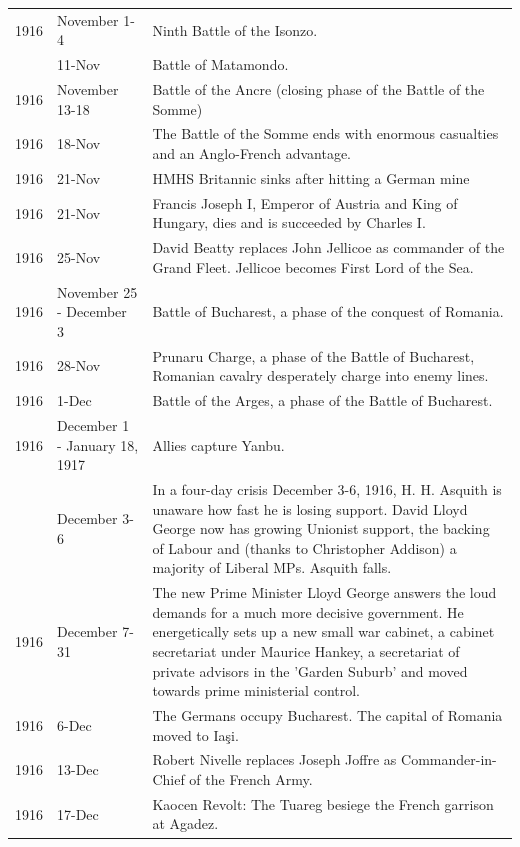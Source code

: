 \documentclass[
  openany]{book}
\begin{document}
\begin{longtable}[t]{rl>{\raggedright\arraybackslash}p{22em}}
\rowcolor{gray!6}  1916 & November 1-4 & Ninth Battle of the Isonzo.\\
\addlinespace
1916 & 11-Nov & Battle of Matamondo.\\
\rowcolor{gray!6}  1916 & November 13-18 & Battle of the Ancre (closing phase of the Battle of the Somme)\\
1916 & 18-Nov & The Battle of the Somme ends with enormous casualties and an Anglo-French advantage.\\
\rowcolor{gray!6}  1916 & 21-Nov & HMHS Britannic sinks after hitting a German mine\\
1916 & 21-Nov & Francis Joseph I, Emperor of Austria and King of Hungary, dies and is succeeded by Charles I.\\
\addlinespace
\rowcolor{gray!6}  1916 & 25-Nov & David Beatty replaces John Jellicoe as commander of the Grand Fleet. Jellicoe becomes First Lord of the Sea.\\
1916 & November 25 - December 3 & Battle of Bucharest, a phase of the conquest of Romania.\\
\rowcolor{gray!6}  1916 & 28-Nov & Prunaru Charge, a phase of the Battle of Bucharest, Romanian cavalry desperately charge into enemy lines.\\
1916 & 1-Dec & Battle of the Arges, a phase of the Battle of Bucharest.\\
\rowcolor{gray!6}  1916 & December 1 - January 18, 1917 & Allies capture Yanbu.\\
\addlinespace
1916 & December 3-6 & In a four-day crisis December 3-6, 1916, H. H. Asquith is unaware how fast he is losing support. David Lloyd George now has growing Unionist support, the backing of Labour and (thanks to Christopher Addison)  a majority of Liberal MPs. Asquith falls.\\
\rowcolor{gray!6}  1916 & December 7-31 & The new Prime Minister Lloyd George answers the loud demands for a much more decisive government. He energetically sets up a new small war cabinet, a cabinet secretariat under Maurice Hankey, a secretariat of private advisors in the 'Garden Suburb' and moved towards prime ministerial control.\\
1916 & 6-Dec & The Germans occupy Bucharest. The capital of Romania moved to Iaşi.\\
\rowcolor{gray!6}  1916 & 13-Dec & Robert Nivelle replaces Joseph Joffre as Commander-in-Chief of the French Army.\\
1916 & 17-Dec & Kaocen Revolt: The Tuareg besiege the French garrison at Agadez.\\

\end{longtable}
\end{document}
